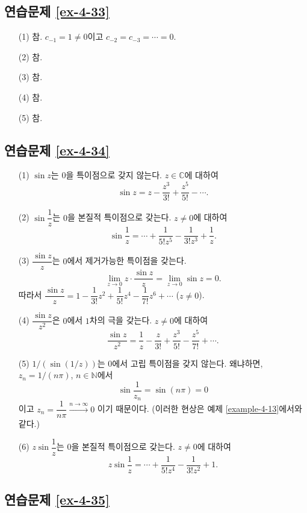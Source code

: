 \subsection*{연습문제 \ref{ex-4-33}}

\begin{itemize}
\item[(1)] 참. 
$c_{-1}=1\ne0$이고 $c_{-2} = c_{-3} = \cdots = 0$.
\item[(2)] 참.
\item[(3)] 참.
\item[(4)] 참.
\item[(5)] 참.
\end{itemize}

\subsection*{연습문제 \ref{ex-4-34}}

\begin{itemize}
\item[(1)]  $\sin z$는 $0$을 특이점으로 갖지 않는다.
$z\in \mathbb C$에 대하여
\[
\sin z = z - \dfrac{z^3}{3!} + \dfrac{z^5}{5!} - \cdots.
\]
\item[(2)] $\sin \dfrac1z$는 $0$을 본질적 특이점으로 갖는다. $z\ne0$에 대하여
\[
\sin \dfrac1z = \cdots + \dfrac1{5!z^5} - \dfrac1{3!z^3} + \dfrac1z.
\]
\item[(3)]  $\dfrac{\sin z}z$는 $0$에서 제거가능한 특이점을 갖는다.
\[
\lim_{z\to 0} z\cdot \dfrac{\sin z}z = \lim_{z\to 0} \sin z = 0.
\]
따라서 $\dfrac{\sin z}{z} = 1  - \dfrac1{3!}z^2  + \dfrac1{5!}z^4 - \dfrac1{7!}z^6 + \cdots$
($z\ne0$).
\item[(4)] $\dfrac{\sin z}{z^2}$은 $0$에서 $1$차의 극을 갖는다.
$z\ne0$에 대하여
\[
\dfrac{\sin z}{z^2} = \dfrac1z - \dfrac z{3!} + \dfrac{z^3}{5!} - \dfrac{z^5}{7!} + \cdots.
\]
\item[(5)] $1/(\sin(1/z))$는 $0$에서 고립 특이점을 갖지 않는다. 왜냐하면,
$z_n = 1/(n\pi)$, $n\in\mathbb N$에서 
\[
\sin \dfrac1{z_n} = \sin(n\pi) = 0
\]
이고 $z_n = \dfrac1{n\pi} \stackrel{n\to\infty}{\longrightarrow} 0$
이기 때문이다. (이러한 현상은 예제 \ref{example-4-13}에서와 같다.)
\item[(6)] $z\sin\dfrac1z$는 $0$을 본질적 특이점으로 갖는다.
$z\ne0$에 대하여
\[
z\sin \dfrac1z = \cdots + \dfrac1{5!z^4} - \dfrac1{3!z^2} +1.
\]
\end{itemize}

\subsection*{연습문제 \ref{ex-4-35}}

